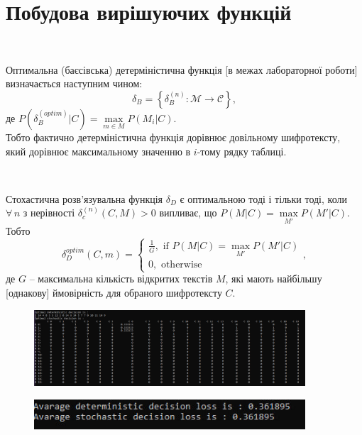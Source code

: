 \section{Побудова вирішуючих функцій}
\begin{definition}    
    ~\par Оптимальна (баєсівська) детерміністична функція [в межах лабораторної роботи] визначається наступним чином: 
    \begin{equation*}
        \delta_{B} = \left\{\delta_{B}^{(n)} : \mathcal{M} \rightarrow \mathcal{C}\right\}, 
    \end{equation*}
    де $P \left(\delta_{B}^{(optim)} \vert C\right) = \max\limits_{m \in M} P \left(M_{i} \vert C\right)$. \\ 
    Тобто фактично детерміністична функція дорівнює довільному шифротексту, який дорівнює максимальному значенню в 
    $i$-тому рядку таблиці.
\end{definition}
\begin{definition}
    ~\par Стохастична розв'язувальна функція $\delta_{D}$ є оптимальною тоді і тільки тоді, коли $\forall \, n$ 
    з нерівності $\delta_{c}^{(n)} \left(C, M\right) > 0$ випливає, що $P \left(M \vert C\right) = \max\limits_{M'} P \left(M' \vert C\right)$.
    Тобто 
    \begin{equation*}
        \delta_{D}^{optim} \left(C, m\right) = 
        \begin{cases}
            \frac{1}{G}, \text{ if } P \left(M \vert C\right) = \max\limits_{M'} P \left(M' \vert C\right) \\
            0, \text{ otherwise}
        \end{cases},
    \end{equation*}
    де $G$ -- максимальна кількість відкритих текстів $M$, які мають найбільшу [однакову] ймовірність для обраного шифротексту $C$.
\end{definition}
\newpage

\begin{figure}[!ht]
    \centering
    \begin{minipage}{0.9\linewidth}
        \includegraphics[width=0.9\textwidth, scale=1.2]{ReportPic/report_4.png}
    \end{minipage}
\end{figure}
\begin{figure}[!ht]
        \centering
        \begin{minipage}{0.9\linewidth}
            \includegraphics[width=0.9\textwidth, scale=1.0]{ReportPic/report_5.png}
        \end{minipage}
\end{figure}

